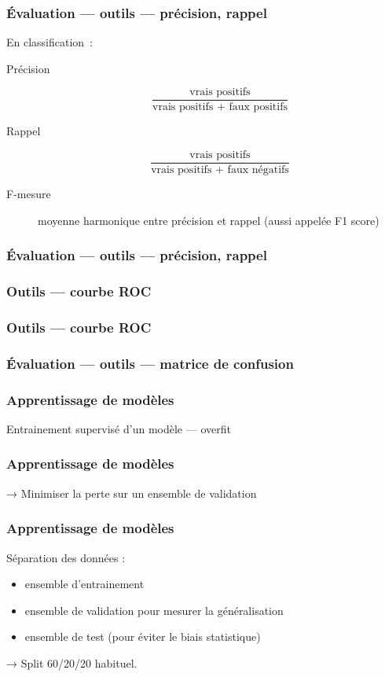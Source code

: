 \begin{frame}
  \frametitle{Évaluation — outils — précision, rappel}
  En classification :
  \begin{description}
  \item[Précision]
    \[
    \frac{\text{vrais positifs}}{\text{vrais positifs + faux positifs}}
    \]
  \item[Rappel]
    \[
    \frac{\text{vrais positifs}}{\text{vrais positifs + faux négatifs}}
  \]
  \item[F-mesure] moyenne harmonique entre précision et rappel (aussi
    appelée F1 score)
  \end{description}
\end{frame}

\begin{frame}
  \frametitle{Évaluation — outils — précision, rappel}
\end{frame}

\begin{frame}
  \frametitle{Outils — courbe ROC}
\end{frame}

\begin{frame}
  \frametitle{Outils — courbe ROC}
\end{frame}

\begin{frame}
  \frametitle{Évaluation — outils — matrice de confusion}
\end{frame}

\begin{frame}
  \frametitle{Apprentissage de modèles}
  Entrainement supervisé d'un modèle — overfit
\end{frame}

\begin{frame}
  \frametitle{Apprentissage de modèles}
  → Minimiser la perte sur un ensemble de validation
\end{frame}

\begin{frame}
  \frametitle{Apprentissage de modèles}
  Séparation des données :
  \begin{itemize}
  \item ensemble d'entrainement
  \item ensemble de validation pour mesurer la généralisation
  \item ensemble de test (pour éviter le biais statistique)
  \end{itemize}
  → Split 60/20/20 habituel.
\end{frame}

